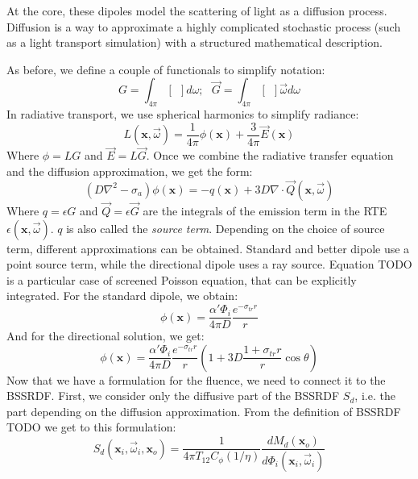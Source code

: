 At the core, these dipoles model the scattering of light as a diffusion process. Diffusion is a way to approximate a highly complicated stochastic process (such as a light transport simulation) with a structured mathematical description. 

As before, we define a couple of functionals to simplify notation:
\begin{equation*}
G = \int_{4\pi} [\ \ ] d\omega; \ \ \ \vec{G} = \int_{4\pi} [\ \ ] \vec{\omega} d\omega
\end{equation*}
In radiative transport, we use spherical harmonics to simplify radiance:
\begin{equation*}
L(\mathbf{x}, \vec{\omega}) = \frac{1}{4\pi}\phi(\mathbf{x}) + \frac{3}{4\pi} \vec{E}(\mathbf{x}) 
\end{equation*}
Where $\phi = L G$ and $\vec{E} = L \vec{G}$. Once we combine the radiative transfer equation and the diffusion approximation, we get the form:
\begin{equation*}
(D \nabla^2 - \sigma_a)\phi(\mathbf{x}) = -q(\mathbf{x}) + 3D \nabla \cdot \vec{Q}(\mathbf{x}, \vec{\omega})
\end{equation*}
Where $q = \epsilon G$ and $\vec{Q} = \epsilon \vec{G}$ are the integrals of the emission term in the RTE $\epsilon(\mathbf{x}, \vec{\omega})$. $q$ is also called the \emph{source term}. Depending on the choice of source term, different approximations can be obtained. Standard and better dipole use a point source term, while the directional dipole uses a ray source. Equation TODO is a particular case of screened Poisson equation, that can be explicitly integrated. For the standard dipole, we obtain:
\begin{equation*}
\phi(\mathbf{x}) = \frac{\alpha' \Phi_i}{4 \pi D} \frac{e^{-\sigma_{tr} r}}{r}
\end{equation*}
And for the directional solution, we get:
\begin{equation*}
\phi(\mathbf{x}) = \frac{\alpha' \Phi_i}{4 \pi D} \frac{e^{-\sigma_{tr} r}}{r} \left(1 + 3D \frac{1 + \sigma_{tr} r}{r} \cos\theta \right)
\end{equation*}
Now that we have a formulation for the fluence, we need to connect it to the BSSRDF. First, we consider only the diffusive part of the BSSRDF $S_d$, i.e. the part depending on the diffusion approximation. From the definition of BSSRDF TODO we get to this formulation:
\begin{equation*}
S_d(\mathbf{x}_i, \vec{\omega}_i, \mathbf{x}_o)  =  \frac{1}{4\pi T_{12}C_\phi(1/\eta)} \frac{d M_d(\mathbf{x}_o)}{d \Phi_i(\mathbf{x}_i, \vec{\omega}_i)} 
\end{equation*} 
